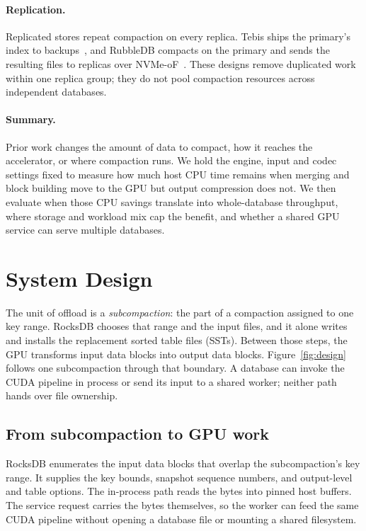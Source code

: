 \documentclass[sigconf, nonacm]{acmart}
\begin{document}
\paragraph{Replication.}
Replicated stores repeat compaction on every replica. Tebis ships the primary's index to
backups~\cite{tebis2022}, and RubbleDB compacts on the primary and sends the resulting files
to replicas over NVMe-oF~\cite{rubbledb2023}. These designs remove duplicated work within one
replica group; they do not pool compaction resources across independent databases.

\paragraph{Summary.}
Prior work changes the amount of data to compact, how it reaches the accelerator, or
where compaction runs. We hold the engine, input and codec settings fixed to measure how
much host CPU time remains when merging and block building move to the GPU but output
compression does not. We then evaluate when those CPU savings translate into whole-database
throughput, where storage and workload mix cap the benefit, and whether a shared GPU
service can serve multiple databases.

\section{System Design}
\label{sec:design}

The unit of offload is a \emph{subcompaction}: the part of a compaction assigned to one
key range. RocksDB chooses that range and the input files, and it alone writes and
installs the replacement sorted table files (SSTs). Between those steps, the GPU
transforms input data blocks into output data blocks. Figure~\ref{fig:design} follows
one subcompaction through that boundary. A database can invoke the CUDA pipeline in
process or send its input to a shared worker; neither path hands over file ownership.

\subsection{From subcompaction to GPU work}

RocksDB enumerates the input data blocks that overlap the subcompaction's key range.
It supplies the key bounds, snapshot sequence numbers, and output-level and table
options. The in-process path reads the bytes into pinned host buffers. The service
request carries the bytes themselves, so the worker can feed the same CUDA pipeline
without opening a database file or mounting a shared filesystem.
\end{document}
